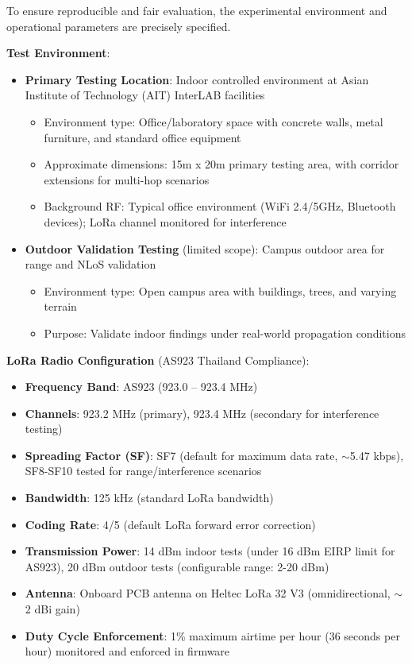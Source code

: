 To ensure reproducible and fair evaluation, the experimental environment and operational parameters are precisely specified.

\textbf{Test Environment}:

\begin{itemize}
\item \textbf{Primary Testing Location}: Indoor controlled environment at Asian Institute of Technology (AIT) InterLAB facilities
\begin{itemize}
\item Environment type: Office/laboratory space with concrete walls, metal furniture, and standard office equipment
\item Approximate dimensions: 15m x 20m primary testing area, with corridor extensions for multi-hop scenarios
\item Background RF: Typical office environment (WiFi 2.4/5GHz, Bluetooth devices); LoRa channel monitored for interference
\end{itemize}

\item \textbf{Outdoor Validation Testing} (limited scope): Campus outdoor area for range and NLoS validation
\begin{itemize}
\item Environment type: Open campus area with buildings, trees, and varying terrain
\item Purpose: Validate indoor findings under real-world propagation conditions
\end{itemize}
\end{itemize}

\textbf{LoRa Radio Configuration} (AS923 Thailand Compliance):

\begin{itemize}
\item \textbf{Frequency Band}: AS923 (923.0 -- 923.4 MHz)
\item \textbf{Channels}: 923.2 MHz (primary), 923.4 MHz (secondary for interference testing)
\item \textbf{Spreading Factor (SF)}: SF7 (default for maximum data rate, $\sim$5.47 kbps), SF8-SF10 tested for range/interference scenarios
\item \textbf{Bandwidth}: 125 kHz (standard LoRa bandwidth)
\item \textbf{Coding Rate}: 4/5 (default LoRa forward error correction)
\item \textbf{Transmission Power}: 14 dBm indoor tests (under 16 dBm EIRP limit for AS923), 20 dBm outdoor tests (configurable range: 2-20 dBm)
\item \textbf{Antenna}: Onboard PCB antenna on Heltec LoRa 32 V3 (omnidirectional, $\sim$2 dBi gain)
\item \textbf{Duty Cycle Enforcement}: 1\% maximum airtime per hour (36 seconds per hour) monitored and enforced in firmware
\end{itemize}


